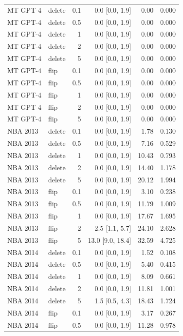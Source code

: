 \begin{longtable}{llrrrr}
MT GPT-4 & delete & 0.1 & 0.0 [0.0, 1.9] & 0.00 & 0.000 \\
MT GPT-4 & delete & 0.5 & 0.0 [0.0, 1.9] & 0.00 & 0.000 \\
MT GPT-4 & delete & 1 & 0.0 [0.0, 1.9] & 0.00 & 0.000 \\
MT GPT-4 & delete & 2 & 0.0 [0.0, 1.9] & 0.00 & 0.000 \\
MT GPT-4 & delete & 5 & 0.0 [0.0, 1.9] & 0.00 & 0.000 \\
MT GPT-4 & flip & 0.1 & 0.0 [0.0, 1.9] & 0.00 & 0.000 \\
MT GPT-4 & flip & 0.5 & 0.0 [0.0, 1.9] & 0.00 & 0.000 \\
MT GPT-4 & flip & 1 & 0.0 [0.0, 1.9] & 0.00 & 0.000 \\
MT GPT-4 & flip & 2 & 0.0 [0.0, 1.9] & 0.00 & 0.000 \\
MT GPT-4 & flip & 5 & 0.0 [0.0, 1.9] & 0.00 & 0.000 \\
NBA 2013 & delete & 0.1 & 0.0 [0.0, 1.9] & 1.78 & 0.130 \\
NBA 2013 & delete & 0.5 & 0.0 [0.0, 1.9] & 7.16 & 0.529 \\
NBA 2013 & delete & 1 & 0.0 [0.0, 1.9] & 10.43 & 0.793 \\
NBA 2013 & delete & 2 & 0.0 [0.0, 1.9] & 14.40 & 1.178 \\
NBA 2013 & delete & 5 & 0.0 [0.0, 1.9] & 20.12 & 1.994 \\
NBA 2013 & flip & 0.1 & 0.0 [0.0, 1.9] & 3.10 & 0.238 \\
NBA 2013 & flip & 0.5 & 0.0 [0.0, 1.9] & 11.79 & 1.009 \\
NBA 2013 & flip & 1 & 0.0 [0.0, 1.9] & 17.67 & 1.695 \\
NBA 2013 & flip & 2 & 2.5 [1.1, 5.7] & 24.10 & 2.628 \\
NBA 2013 & flip & 5 & 13.0 [9.0, 18.4] & 32.59 & 4.725 \\
NBA 2014 & delete & 0.1 & 0.0 [0.0, 1.9] & 1.52 & 0.108 \\
NBA 2014 & delete & 0.5 & 0.0 [0.0, 1.9] & 5.40 & 0.415 \\
NBA 2014 & delete & 1 & 0.0 [0.0, 1.9] & 8.09 & 0.661 \\
NBA 2014 & delete & 2 & 0.0 [0.0, 1.9] & 11.81 & 1.001 \\
NBA 2014 & delete & 5 & 1.5 [0.5, 4.3] & 18.43 & 1.724 \\
NBA 2014 & flip & 0.1 & 0.0 [0.0, 1.9] & 3.17 & 0.267 \\
NBA 2014 & flip & 0.5 & 0.0 [0.0, 1.9] & 11.28 & 0.978 \\

\end{longtable}
